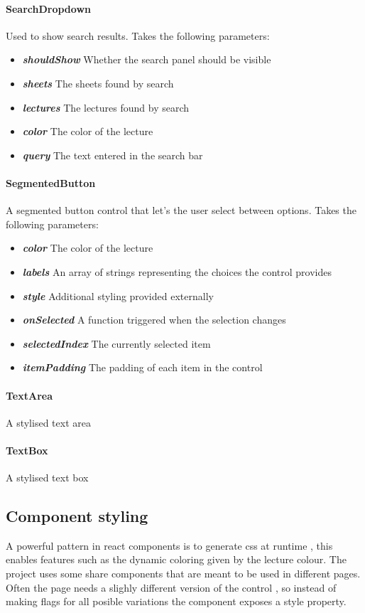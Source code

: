 \paragraph{SearchDropdown} Used to show search results. Takes the following parameters:
\begin{itemize}
	\item \textit{\textbf{shouldShow}} Whether the search panel should be visible
	\item \textit{\textbf{sheets}} The sheets found by search
	\item \textit{\textbf{lectures}} The lectures found by search
	\item \textit{\textbf{color}} The color of the lecture
	\item \textit{\textbf{query}} The text entered in the search bar
\end{itemize}
\paragraph{SegmentedButton} A segmented button control that let's the user select between options. Takes the following parameters:
\begin{itemize}
	\item \textit{\textbf{color}} The color of the lecture
	\item \textit{\textbf{labels}} An array of strings representing the choices the control provides
	\item \textit{\textbf{style}} Additional styling provided externally
	\item \textit{\textbf{onSelected}} A function triggered when the selection changes
	\item \textit{\textbf{selectedIndex}} The currently selected item
	\item \textit{\textbf{itemPadding}} The padding of each item in the control
\end{itemize}
\paragraph{TextArea} A stylised text area
\paragraph{TextBox} A stylised text box

\subsection{Component styling}
A powerful pattern in react components is to generate css at runtime , this enables features such as the dynamic coloring given by the lecture colour. The project uses some share components that are meant to be used in different pages. Often the page needs a slighly different version of the control , so instead of making flags for all posible variations the component exposes a style property.

